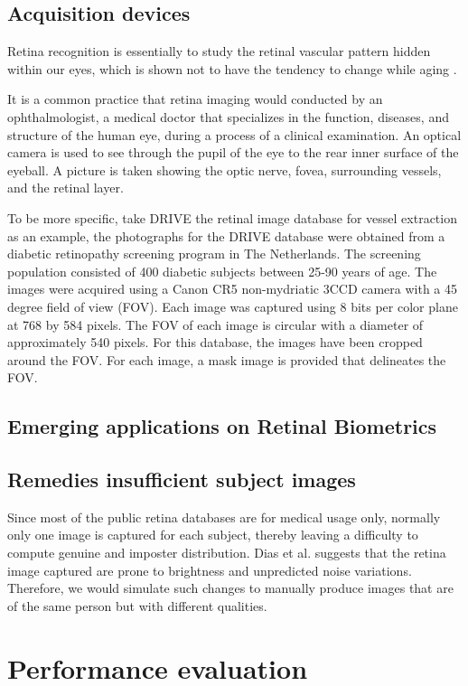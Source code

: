 \documentclass[a4paper,11pt]{article}
\theoremstyle{plain} %
\begin{document}
\subsection{Acquisition devices}
Retina recognition is essentially to study the retinal vascular pattern hidden within our eyes, which is shown not to have the tendency to change while aging \cite{fatima2013feature}. 

It is a common practice that retina imaging would conducted by an ophthalmologist, a medical doctor that specializes in the function, diseases, and structure of the human eye, during a process of a clinical examination. An optical camera is used to see through the pupil of the eye to the rear inner surface of the eyeball. A picture is taken showing the optic nerve, fovea, surrounding vessels, and the retinal layer.

To be more specific, take DRIVE the retinal image database for vessel extraction as an example, the photographs for the DRIVE database were obtained from a diabetic retinopathy screening program in The Netherlands. The screening population consisted of 400 diabetic subjects between 25-90 years of age. The images were acquired using a Canon CR5 non-mydriatic 3CCD camera with a 45 degree field of view (FOV). Each image was captured using 8 bits per color plane at 768 by 584 pixels. The FOV of each image is circular with a diameter of approximately 540 pixels. For this database, the images have been cropped around the FOV. For each image, a mask image is provided that delineates the FOV.
\subsection{Emerging applications on Retinal Biometrics}

\subsection{Remedies insufficient subject images}
Since most of the public retina databases are for medical usage only, normally only one image is captured for each subject, thereby leaving a difficulty to compute genuine and imposter distribution. Dias et al. \cite{dias2014retinal} suggests that the retina image captured are prone to brightness and unpredicted noise variations. Therefore, we would simulate such changes to manually produce images that are of the same person but with different qualities. 



\section{Performance evaluation}
\end{document}
